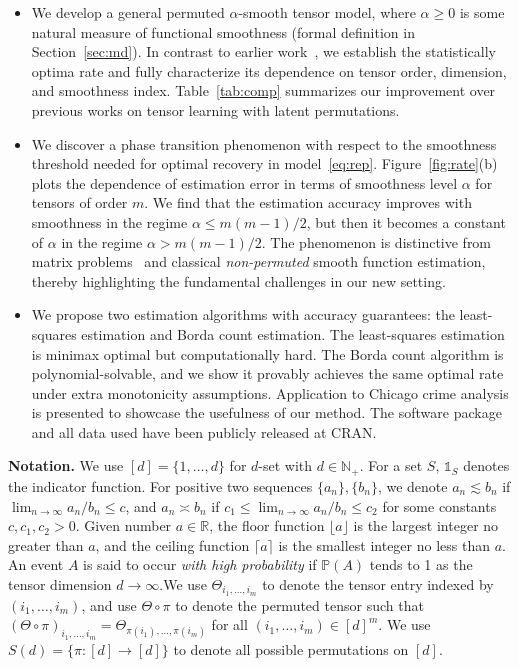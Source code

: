\documentclass{article}
\theoremstyle{definition}
\begin{document}
\begin{itemize}[wide,labelwidth=0pt, labelindent=0pt,itemsep=.4ex,topsep=-2pt]
\item We develop a general permuted $\alpha$-smooth tensor model, where $\alpha\geq 0$ is some natural measure of functional smoothness (formal definition in Section~\ref{sec:md}). In contrast to earlier work~\cite{balasubramanian2021nonparametric,li2019nearest}, we establish the statistically optima rate and fully characterize its dependence on tensor order, dimension, and smoothness index. Table~\ref{tab:comp} summarizes our improvement over previous works on tensor learning with latent permutations. 

\item We discover a phase transition phenomenon with respect to the smoothness threshold needed for optimal recovery in model~\eqref{eq:rep}. 
Figure~\ref{fig:rate}(b) plots the dependence of estimation error in terms of smoothness level $\alpha$ for tensors of order $m$. We find that the estimation accuracy improves with smoothness in the regime $\alpha \leq m(m-1)/2$, but then it becomes a constant of $\alpha$ in the regime $ \alpha > m(m-1)/2$. The phenomenon is distinctive from matrix problems~\citep{klopp2017oracle} and classical \emph{non-permuted} smooth function estimation, thereby highlighting the fundamental challenges in our new setting. 

\item We propose two estimation algorithms with accuracy guarantees: the least-squares estimation and Borda count estimation. The least-squares estimation is minimax optimal but computationally hard. The Borda count algorithm is polynomial-solvable, and we show it provably achieves the same optimal rate under extra monotonicity assumptions. Application to Chicago crime analysis is presented to showcase the usefulness of our method. The software package and all data used have been publicly released at CRAN.
\end{itemize}


{\bf Notation.} We use $[d]=\{1,\ldots,d\}$ for $d$-set with $d\in\mathbb{N}_{+}$. For a set $S$, $\mathds{1}_S$ denotes the indicator function. For positive two sequences $\{a_n\},\{b_n\}$,  we denote $a_n\lesssim b_n$ if $\lim_{n\to\infty} a_n/b_n\leq c$,  and $a_n\asymp b_n$ if $c_1\leq \lim_{n\to \infty} a_n/b_n\leq c_2$ for some constants $c,c_1,c_2>0$. Given number $a\in\mathbb{R}$, the floor function $\lfloor a\rfloor$ is the largest integer no greater than $a$, and the ceiling function $\lceil a\rceil$ is the smallest integer no less than $a$. An event $A$ is said to occur \emph{with high probability} if $\mathbb{P}(A)$ tends to 1 as the tensor dimension $d\to\infty$.We use $\Theta_{i_1,\ldots,i_m}$ to denote the tensor entry indexed by $(i_1,\ldots,i_m)$, and use $\Theta\circ\pi$ to denote the permuted tensor such that $(\Theta\circ\pi)_{i_1,\ldots,i_m} = \Theta_{\pi(i_1),\ldots,\pi(i_m)}$ for all $(i_1,\ldots,i_m)\in[d]^m$. We use $S(d)=\{\pi\colon [d]\to[d]\}$ to denote all possible permutations on $[d]$.
\end{document}
